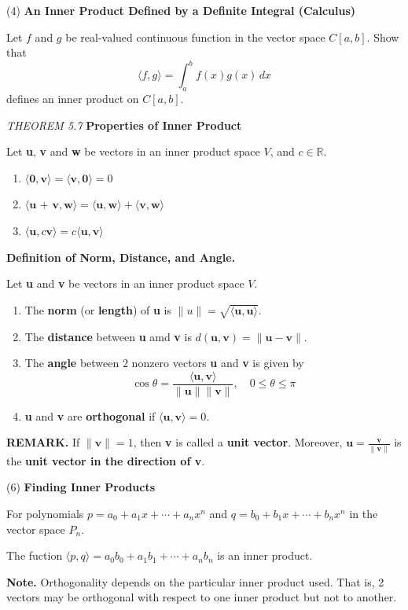 \documentclass{article}
\newcommand\B{\textbf}
\newcommand\tcl{\begin{tcolorbox}[colback = {blue9}]}
\newcommand\etcl{\end{tcolorbox}}
\newcommand\R{\mathbb{R}}
\newcommand\T{\textit}
\newcommand\la{\langle}
\newcommand\ra{\rangle}
\begin{document}
    (4) \B{An Inner Product Defined by a Definite Integral (Calculus)}
    
    Let $f$ and $g$ be real-valued continuous function in the vector space $C[a,b]$.  Show that
    \[ \la f, g \ra = \int_a^b f(x)g(x) \,dx  \]
    defines an inner product on $C[a,b]$.

    \tcl
    \T{THEOREM 5.7 } \B{Properties of Inner Product}

    Let \B{u}, \B{v} and \B{w} be vectors in an inner product space $V$, and $c \in \R$.
    \begin{enumerate}
        \item $\la \B{0}, \B{v} \ra = \la \B{v}, \B{0} \ra = 0$
        \item $\la \B{u + v}, \B{w} \ra = \la \B{u}, \B{w} \ra +  \la \B{v}, \B{w} \ra $
        \item $ \la \B{u}, c\B{v} \ra = c\la \B{u}, \B{v} \ra$
    \end{enumerate}
    \etcl 

    \tcl
    \B{Definition of Norm, Distance, and Angle.}

    Let \B{u} and \B{v} be vectors in an inner product space $V$.
    \begin{enumerate}
        \item The \B{norm} (or \B{length}) of \B{u} is $\| u \| = \sqrt{\la \B{u}, \B{u} \ra}$.
        \item The \B{distance} between \B{u} amd \B{v} is $d(\B{u}, \B{v}) = \| \B{u} - \B{v} \|$.
        \item The \B{angle} between 2 nonzero vectors \B{u} and \B{v} is given by
            \[ \cos{\theta} = \frac{\la \B{u}, \B{v} \ra }{\|\B{u}\| \|\B{v}\|}, \quad 0 \le \theta \le \pi \]
        \item \B{u} and \B{v} are \B{orthogonal} if $\la \B{u}, \B{v} \ra = 0$.
    \end{enumerate}
    \etcl 
    \B{REMARK. } If $\| \B{v}  \| = 1$, then \B{v} is called a \B{unit vector}. Moreover, $\B{u} = \frac{\B{v}}{\| \B{v} \|}$
    is the \B{unit vector in the direction of v}.
    
    (6) \B{Finding Inner Products}

    For polynomials $p = a_0 + a_1x + \cdots + a_nx^n$ and $q = b_0 + b_1x + \cdots + b_nx^n$ in the vector space $P_n$.
    
    The fuction  $ \la p, q \ra = a_0b_0 + a_1b_1 + \cdots + a_nb_n $ is an inner product.

    \B{Note.} Orthogonality depends on the particular inner product used. That is, 2 vectors may be 
    orthogonal with respect to one inner product but not to another.
\end{document}
